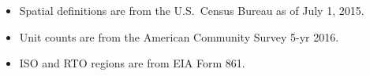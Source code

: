 \begin{itemize}
\item Spatial definitions are from the U.S.~Census Bureau as of July 1, 2015.
\item Unit counts are from the American Community Survey 5-yr 2016.
\item ISO and RTO regions are from EIA Form 861.
\end{itemize}
